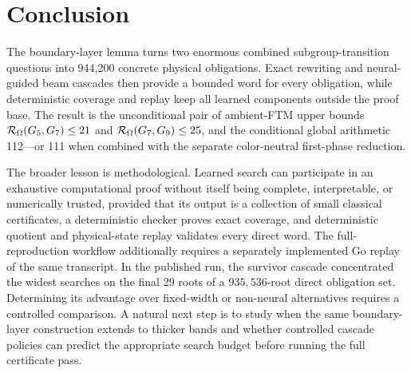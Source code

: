 \section{Conclusion}
\label{sec:conclusion}

The boundary-layer lemma turns two enormous combined subgroup-transition
questions into 944,200 concrete physical obligations.  Exact rewriting and
neural-guided beam cascades then provide a bounded word for every obligation,
while deterministic
coverage and replay keep all learned components outside the proof base.  The
result is the unconditional pair of ambient-FTM upper bounds
$\mathcal{R}_{\Omega}(G_5,G_7)\leq21$ and
$\mathcal{R}_{\Omega}(G_7,G_9)\leq25$, and the conditional
global arithmetic 112---or 111 when combined with the separate color-neutral
first-phase reduction.

The broader lesson is methodological.  Learned search can participate in an
exhaustive computational proof without itself being complete, interpretable,
or numerically trusted, provided that its output is a collection of small
classical certificates, a deterministic checker proves exact coverage, and
deterministic quotient and physical-state replay validates every direct word.
The full-reproduction workflow additionally requires a separately implemented
Go replay of the same transcript.  In the published run, the survivor cascade concentrated the widest
searches on the final 29 roots of a $935{,}536$-root direct obligation set.
Determining its advantage over fixed-width or non-neural alternatives requires
a controlled comparison.  A natural next step is to study when
the same boundary-layer construction extends to thicker bands and whether
controlled cascade policies can predict the appropriate search budget before
running the full certificate pass.
